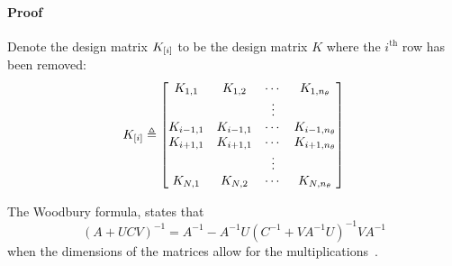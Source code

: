 \begin{subappendices}
\paragraph{Proof}
Denote the design matrix $\ignoring{i}{K}$ to be the design matrix $K$ where the $i^{\text{th}}$ row has been removed:
\begin{equation}
  \ignoring{i}{K}
  \isdef
  \begin{bmatrix}
    K_{1,1} & K_{1,2} & \cdots & K_{1,\nth}\\
   && \vdots\\
    K_{i-1,1} & K_{i-1,1} & \cdots & K_{i-1,\nth}\\
    K_{i+1,1} & K_{i+1,1} & \cdots & K_{i+1,\nth}\\
    && \vdots\\
    K_{N,1} & K_{N,2} & \cdots & K_{N,\nth}\\
  \end{bmatrix}
\end{equation}

\begin{lemma}\label{lem:matrix-inversion-lemma}
The Woodbury formula, states that
\begin{equation*}
\left(A+UCV \right)^{-1} 
= 
A^{-1} - A^{-1} U \left(C^{-1}+VA^{-1}U \right)^{-1} VA^{-1}
\end{equation*}
when the dimensions of the matrices allow for the multiplications~\citep[Section 3.2.2]{matrixcookbook}.
\end{lemma}



\end{subappendices}
